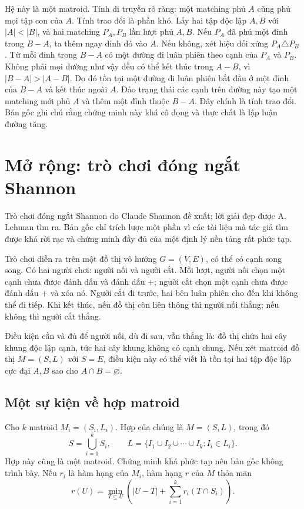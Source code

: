 \documentclass[11pt]{article}
\begin{document}
Hệ này là một matroid. Tính di truyền rõ ràng: một matching phủ \(A\) cũng phủ
mọi tập con của \(A\). Tính trao đổi là phần khó. Lấy hai tập độc lập \(A,B\)
với \(|A|<|B|\), và hai matching \(P_A,P_B\) lần lượt phủ \(A,B\). Nếu \(P_A\)
đã phủ một đỉnh trong \(B-A\), ta thêm ngay đỉnh đó vào \(A\). Nếu không, xét
hiệu đối xứng \(P_A\triangle P_B\). Từ mỗi đỉnh trong \(B-A\) có một đường đi
luân phiên theo cạnh của \(P_A\) và \(P_B\). Không phải mọi đường như vậy đều
có thể kết thúc trong \(A-B\), vì \(|B-A|>|A-B|\). Do đó tồn tại một đường đi
luân phiên bắt đầu ở một đỉnh của \(B-A\) và kết thúc ngoài \(A\). Đảo trạng
thái các cạnh trên đường này tạo một matching mới phủ \(A\) và thêm một đỉnh
thuộc \(B-A\). Đây chính là tính trao đổi. Bản gốc ghi chú rằng chứng minh này
khá cô đọng và thực chất là lập luận đường tăng.

\section{Mở rộng: trò chơi đóng ngắt Shannon}

Trò chơi đóng ngắt Shannon do Claude Shannon đề xuất; lời giải đẹp được
A. Lehman tìm ra. Bản gốc chỉ trích lược một phần vì các tài liệu mà tác giả
tìm được khá rời rạc và chứng minh đầy đủ của một định lý nền tảng rất phức
tạp.

Trò chơi diễn ra trên một đồ thị vô hướng \(G=(V,E)\), có thể có cạnh song
song. Có hai người chơi: người nối và người cắt. Mỗi lượt, người nối chọn một
cạnh chưa được đánh dấu và đánh dấu \(+\); người cắt chọn một cạnh chưa được
đánh dấu \(+\) và xóa nó. Người cắt đi trước, hai bên luân phiên cho đến khi
không thể đi tiếp. Khi kết thúc, nếu đồ thị còn liên thông thì người nối
thắng; nếu không thì người cắt thắng.

Điều kiện cần và đủ để người nối, dù đi sau, vẫn thắng là: đồ thị chứa hai
cây khung độc lập cạnh, tức hai cây khung không có cạnh chung. Nếu xét matroid
đồ thị \(M=(S,L)\) với \(S=E\), điều kiện này có thể viết là tồn tại hai tập
độc lập cực đại \(A,B\) sao cho \(A\cap B=\varnothing\).

\subsection*{Một sự kiện về hợp matroid}

Cho \(k\) matroid \(M_i=(S_i,L_i)\). Hợp của chúng là \(M=(S,L)\), trong đó
\[
  S=\bigcup_{i=1}^k S_i,\qquad
  L=\{I_1\cup I_2\cup\cdots\cup I_k: I_i\in L_i\}.
\]
Hợp này cũng là một matroid. Chứng minh khá phức tạp nên bản gốc không trình
bày. Nếu \(r_i\) là hàm hạng của \(M_i\), hàm hạng \(r\) của \(M\) thỏa mãn
\[
  r(U)=\min_{T\subseteq U}\left(|U-T|+\sum_{i=1}^k r_i(T\cap S_i)\right).
\]
\end{document}
